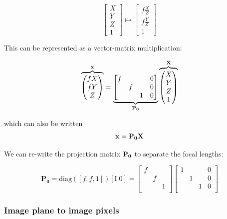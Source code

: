 \documentclass{article}
\begin{document}
\[
  \begin{bmatrix}
    X \\ Y \\ Z \\ 1
  \end{bmatrix} \mapsto
  \begin{bmatrix}
    f \frac{X}{Z} \\ f \frac{Y}{Z} \\ 1
  \end{bmatrix}
\]

This can be represented as a vector-matrix multiplication:

\[
  \overbrace{\begin{pmatrix}
    f X \\ f Y \\ Z
  \end{pmatrix}}^{\bf x} =
  \underbrace{\begin{bmatrix}
    f & & & 0\\
    & f & & 0\\
    & & 1 & 0\\
  \end{bmatrix}}_{\bf P_{0}}
  \overbrace{\begin{pmatrix}
X \\Y \\ Z \\ 1
\end{pmatrix}}^{\bf X}
\]

which can also be written
\[
  \bf x = P_{0}X
\]

We can re-write the projection matrix $\bf P_{0}$ to separate the focal lengths:

\[
  \mathbf{P_{0}} = \text{diag}([f,f,1])[\text{I}|0] = \begin{bmatrix}
    f & & \\
    & f & \\
    & & 1 \\
  \end{bmatrix}\begin{bmatrix}
    1 & & & 0 \\
    & 1 & & 0 \\
    & & 1 & 0 \\
  \end{bmatrix}
\]

\subsubsection{Image plane to image pixels}
\end{document}
